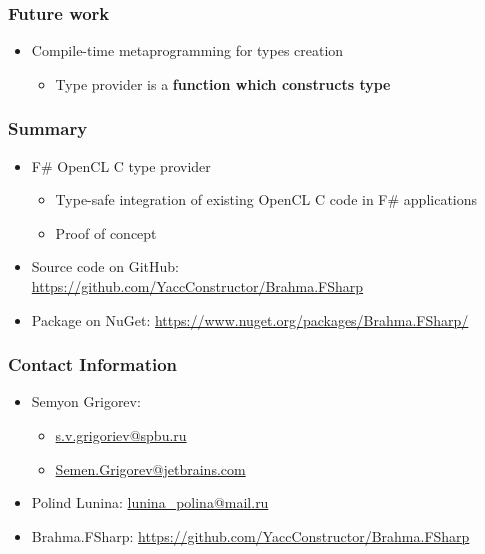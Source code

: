 \documentclass[xcolor=table]{beamer}
\begin{document}
\begin{frame}
  \transwipe[direction=90]
  \frametitle{Future work}
\begin{itemize}
 \item Compile-time metaprogramming for types creation
 \begin{itemize}
  \item Type provider is a \textbf{function which constructs type}
 \end{itemize}

\end{itemize}

\end{frame}


\begin{frame}
  \transwipe[direction=90]
  \frametitle{Summary}
\begin{itemize}
\item F\# OpenCL C type provider
\begin {itemize}
\item Type-safe integration of existing OpenCL C code in F\# applications
\item Proof of concept
\end{itemize}
\vspace{1cm}
\item Source code on GitHub: \url{https://github.com/YaccConstructor/Brahma.FSharp}
\item Package on NuGet: \url{https://www.nuget.org/packages/Brahma.FSharp/}
\end{itemize}
\end{frame}

\begin{frame}
\frametitle{Contact Information}
\begin{itemize}
  \item Semyon Grigorev:
    \begin{itemize}
      \item \href{mailto:s.v.grigoriev@spbu.ru}{s.v.grigoriev@spbu.ru}
      \item \href{mailto:Semen.Grigorev@jetbrains.com}{Semen.Grigorev@jetbrains.com}
    \end{itemize}
  \item Polind Lunina: \href{mailto:lunina_polina@mail.ru}{lunina\_polina@mail.ru}
\end{itemize}
\begin{itemize}
  \item Brahma.FSharp: \href{https://github.com/YaccConstructor/Brahma.FSharp}{https://github.com/YaccConstructor/Brahma.FSharp}
\end{itemize}
\hspace{2cm}
\end{frame}
\end{document}
